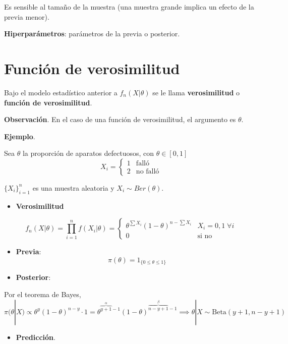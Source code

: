 \documentclass[
  12pt,
]{book}
\providecommand{\tightlist}{%
  \setlength{\itemsep}{0pt}\setlength{\parskip}{0pt}}
\begin{document}
Es sensible al tamaño de la muestra (una muestra grande implica un efecto de la previa menor).

\textbf{Hiperparámetros}: parámetros de la previa o posterior.

\hypertarget{funciuxf3n-de-verosimilitud}{%
\section{Función de verosimilitud}\label{funciuxf3n-de-verosimilitud}}

Bajo el modelo estadístico anterior a \(f_n(X|\theta)\) se le llama \textbf{verosimilitud} o \textbf{función de verosimilitud}.

\textbf{Observación}. En el caso de una función de verosimilitud, el argumento es \(\theta\).

\textbf{Ejemplo}.

Sea \(\theta\) la proporción de aparatos defectuosos, con \(\theta \in [0,1]\)
\[ X_i = \begin{cases}1 & \text{falló} \\ 2 & \text{no falló}\end{cases}\]

\(\{X_i\}_{i=1}^n\) es una muestra aleatoria y \(X_i \sim Ber(\theta)\).

\begin{itemize}
\tightlist
\item
  \textbf{Verosimilitud}
\end{itemize}

\[ f_n(X|\theta) = \prod_{i=1}^n f(X_i|\theta) = \begin{cases}\theta^{\sum X_i}(1-\theta)^{n-\sum X_i} & X_i = 0,1\; \forall i\\ 0 & \text{si no}\end{cases}\]

\begin{itemize}
\item
  \textbf{Previa}:
  \[\pi(\theta) = 1_{\{0\leq\theta\leq 1\}}\]
\item
  \textbf{Posterior}:
\end{itemize}

Por el teorema de Bayes,
\[\pi(\theta|X) \propto \theta^y (1-\theta)^{n-y}\cdot 1 = \theta^{\overbrace{y+1}^{\alpha}-1}(1-\theta)^{\overbrace{n-y+1}^{\beta}-1} \implies \theta|X \sim \text{Beta}(y+1,n-y+1)\]

\begin{itemize}
\tightlist
\item
  \textbf{Predicción}.
\end{itemize}
\end{document}
